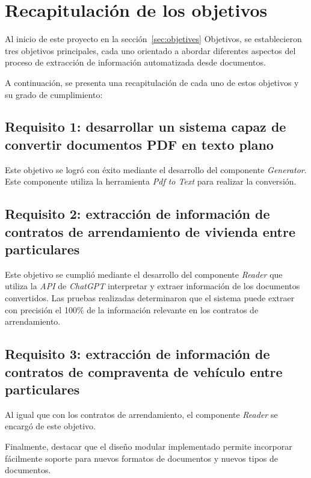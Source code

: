 \section{Recapitulación de los objetivos}

Al inicio de este proyecto en la sección~\ref{sec:objetives} Objetivos, se establecieron tres objetivos principales,
cada uno orientado a abordar diferentes aspectos del proceso de extracción de información automatizada desde documentos.

A continuación, se presenta una recapitulación de cada uno de estos objetivos y su grado de cumplimiento:

\subsection{Requisito 1: desarrollar un sistema capaz de convertir documentos PDF en texto plano}

Este objetivo se logró con éxito mediante el desarrollo del componente \textit{Generator}.
Este componente utiliza la herramienta \textit{Pdf to Text} para realizar la conversión.

\subsection{Requisito 2: extracción de información de contratos de arrendamiento de vivienda entre particulares}

Este objetivo se cumplió mediante el desarrollo del componente \textit{Reader} que utiliza la \textit{API}
de \textit{ChatGPT} interpretar y extraer información de los documentos convertidos.
Las pruebas realizadas determinaron que el sistema puede extraer con precisión el 100\% de la información relevante
en los contratos de arrendamiento.

\subsection{Requisito 3: extracción de información de contratos de compraventa de vehículo entre particulares}

Al igual que con los contratos de arrendamiento, el componente \textit{Reader} se encargó de este objetivo.

Finalmente, destacar que el diseño modular implementado permite incorporar fácilmente soporte para nuevos formatos de
documentos y nuevos tipos de documentos.
